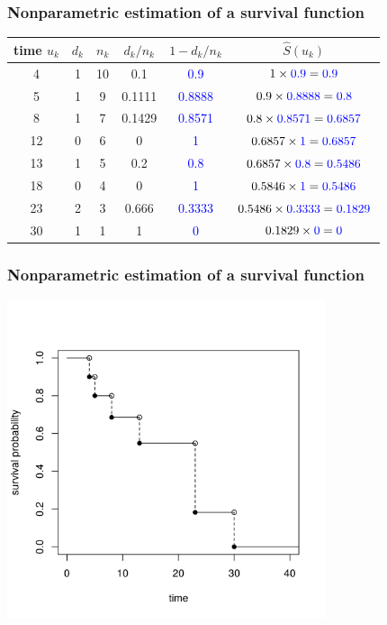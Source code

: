 \documentclass[10pt,t]{beamer}
\begin{document}
\begin{frame}
\frametitle{Nonparametric estimation of a survival function}

\begin{tabular}{|c|c|c|c|c|c|}
\hline
time $u_k$ & $d_k$ & $n_k$ & $d_k/n_k$ & $1 - d_k/n_k$ & $\widehat{S}(u_k)$ \\
\hline
4 & 1 & 10 & 0.1 & \textcolor{blue}{0.9} & $1 \times \textcolor{blue}{0.9} = \textcolor{blue}{0.9}$\\
5 & 1 & 9 & 0.1111 & \textcolor{blue}{0.8888} & $0.9 \times \textcolor{blue}{0.8888} = \textcolor{blue}{0.8}$ \\
8 & 1 & 7 & 0.1429 & \textcolor{blue}{0.8571} & $0.8 \times \textcolor{blue}{0.8571} = \textcolor{blue}{0.6857}$\\
12 & 0 & 6 & 0 & \textcolor{blue}{1} & $0.6857 \times \textcolor{blue}{1} = \textcolor{blue}{0.6857}$\\
13 & 1 & 5 & 0.2 & \textcolor{blue}{0.8} & $0.6857 \times \textcolor{blue}{0.8} = \textcolor{blue}{0.5486}$\\
18 & 0 & 4 & 0 & \textcolor{blue}{1} & $0.5846 \times \textcolor{blue}{1} = \textcolor{blue}{0.5486}$\\
23 & 2 & 3 & 0.666 & \textcolor{blue}{0.3333} & $0.5486 \times \textcolor{blue}{0.3333} = \textcolor{blue}{0.1829}$\\
30 & 1 & 1 & 1 & \textcolor{blue}{0} & $0.1829 \times \textcolor{blue}{0} = \textcolor{blue}{0}$\\
\hline
\end{tabular}
\end{frame}

\begin{frame}
\frametitle{Nonparametric estimation of a survival function}

\centering
\includegraphics[width=0.7\textwidth]{figs/km_small_example.png}
\end{frame}
\end{document}
